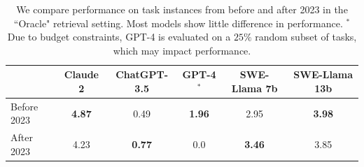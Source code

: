 \begin{table}[ht]
\centering
\caption{
We compare performance on task instances from before and after 2023 in the ``Oracle" retrieval setting.
Most models show little difference in performance. $^*$Due to budget constraints, GPT-4 is evaluated on a $25\%$ random subset of \benchmark{} tasks, which may impact performance.
}
\begin{tabular}{lccccc}
\toprule
    & Claude 2   & ChatGPT-3.5 & GPT-4$^*$  & SWE-Llama 7b & SWE-Llama 13b \\
\midrule
    Before 2023 & {\bf 4.87} & 0.49        & {\bf 1.96} & 2.95         & {\bf 3.98} \\
    After 2023   & 4.23       & {\bf 0.77}  & 0.0        & {\bf 3.46}   & {3.85} \\
\bottomrule
\end{tabular}
\label{table:temporal-results}
\end{table}